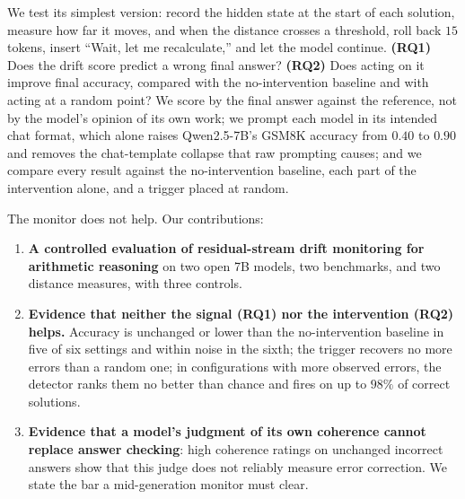 \documentclass{article}
\begin{document}
We test its simplest version: record the hidden state at the start of each solution, measure how far it moves, and when the distance crosses a threshold, roll back $15$ tokens, insert ``Wait, let me recalculate,'' and let the model continue. \textbf{(RQ1)} Does the drift score predict a wrong final answer? \textbf{(RQ2)} Does acting on it improve final accuracy, compared with the no-intervention baseline and with acting at a random point? We score by the final answer against the reference, not by the model's opinion of its own work; we prompt each model in its intended chat format, which alone raises Qwen2.5-7B's GSM8K accuracy from $0.40$ to $0.90$ and removes the chat-template collapse that raw prompting causes; and we compare every result against the no-intervention baseline, each part of the intervention alone, and a trigger placed at random.

The monitor does not help. Our contributions:
\begin{enumerate}[leftmargin=*,itemsep=1pt,topsep=2pt]
  \item \textbf{A controlled evaluation of residual-stream drift monitoring for arithmetic reasoning} on two open 7B models, two benchmarks, and two distance measures, with three controls.
  \item \textbf{Evidence that neither the signal (RQ1) nor the intervention (RQ2) helps.} Accuracy is unchanged or lower than the no-intervention baseline in five of six settings and within noise in the sixth; the trigger recovers no more errors than a random one; in configurations with more observed errors, the detector ranks them no better than chance and fires on up to $98\%$ of correct solutions.
  \item \textbf{Evidence that a model's judgment of its own coherence cannot replace answer checking}: high coherence ratings on unchanged incorrect answers show that this judge does not reliably measure error correction. We state the bar a mid-generation monitor must clear.
\end{enumerate}
\end{document}
